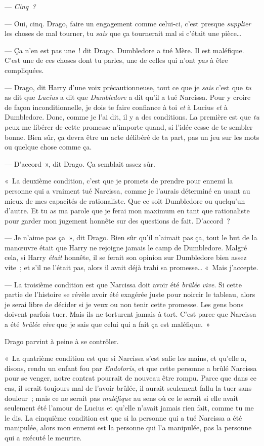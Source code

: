 --- \emph{Cinq~?}

--- Oui, cinq.
Drago, faire un engagement comme celui-ci, c'est presque \emph{supplier} les choses de mal tourner, tu \emph{sais} que ça tournerait mal si c'était une pièce…

--- Ça n'en est pas une~! dit Drago.
Dumbledore a tué Mère.
Il est maléfique.
C'est une de ces choses dont tu parles, une de celles qui n'ont \emph{pas} à être compliquées.

--- Drago, dit Harry d'une voix précautionneuse, tout ce que je \emph{sais} c'est que \emph{tu} as dit que \emph{Lucius} a dit que \emph{Dumbledore} a dit qu'il a tué Narcissa.
Pour y croire de façon inconditionnelle, je dois te faire confiance à toi \emph{et} à Lucius \emph{et} à Dumbledore.
Donc, comme je l'ai dit, il y a des conditions.
La première est que \emph{tu} peux me libérer de cette promesse n'importe quand, si l'idée cesse de te sembler bonne.
Bien sûr, ça devra être un acte délibéré de ta part, pas un jeu sur les mots ou quelque chose comme ça.

--- D'accord~», dit Drago.
Ça semblait assez sûr.

«~La deuxième condition, c'est que je promets de prendre pour ennemi la personne qui a vraiment tué Narcissa, comme je l'aurais déterminé en usant au mieux de mes capacités de rationaliste.
Que ce soit Dumbledore ou quelqu'un d'autre.
Et tu as ma parole que je ferai mon maximum en tant que rationaliste pour garder mon jugement honnête sur des questions de fait.
D'accord~?

--- Je n'aime pas ça~», dit Drago.
Bien sûr qu'il n'aimait pas ça, tout le but de la manœuvre était que Harry ne rejoigne jamais le camp de Dumbledore.
Malgré cela, si Harry \emph{était} honnête, il se ferait son opinion sur Dumbledore bien assez vite~; et s'il ne l'était pas, alors il avait déjà trahi sa promesse…
«~Mais j'accepte.

--- La troisième condition est que Narcissa doit avoir été \emph{brûlée vive}.
Si cette partie de l'histoire se révèle avoir été exagérée juste pour noircir le tableau, alors je serai libre de décider si je veux ou non tenir cette promesse.
Les gens bons doivent parfois tuer.
Mais ils ne torturent jamais à tort.
C'est parce que Narcissa a été \emph{brûlée vive} que je sais que celui qui a fait ça est maléfique.~»

Drago parvint à peine à se contrôler.

«~La quatrième condition est que si Narcissa s'est salie les mains, et qu'elle a, disons, rendu un enfant fou par \emph{Endoloris}, et que cette personne a brûlé Narcissa pour se venger, notre contrat pourrait de nouveau être rompu.
Parce que dans ce cas, il serait toujours mal de l'avoir brûlée, il aurait seulement fallu la tuer sans douleur~; mais ce ne serait pas \emph{maléfique} au sens où ce le serait si elle avait seulement été l'amour de Lucius et qu'elle n'avait jamais rien fait, comme tu me le dis.
La cinquième condition est que si la personne qui a tué Narcissa a été manipulée, alors mon ennemi est la personne qui l'a manipulée, pas la personne qui a exécuté le meurtre.

